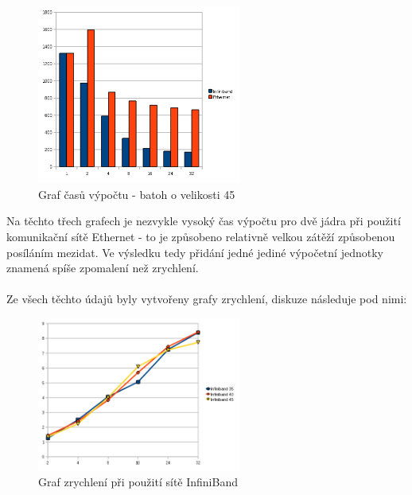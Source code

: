 \documentclass[12pt]{article}
\begin{document}
\begin{figure}[H]
\begin{center}
\includegraphics[width=0.6\textwidth]{par/45}
\caption{Graf časů výpočtu -  batoh o velikosti 45}
\label{fig:problem_45}
\end{center}
\end{figure}

Na těchto třech grafech je nezvykle vysoký čas výpočtu pro dvě jádra při použití komunikační sítě Ethernet - to je způsobeno relativně velkou zátěží způsobenou posíláním mezidat. Ve výsledku tedy přidání jedné jediné výpočetní jednotky znamená spíše zpomalení než zrychlení.\\
\\

Ze všech těchto údajů byly vytvořeny grafy zrychlení, diskuze následuje pod nimi:

\begin{figure}[H]
\begin{center}
\includegraphics[width=0.6\textwidth]{par/inf}
\caption{Graf zrychlení při použití sítě InfiniBand}
\label{fig:inf}
\end{center}
\end{figure}
\end{document}
